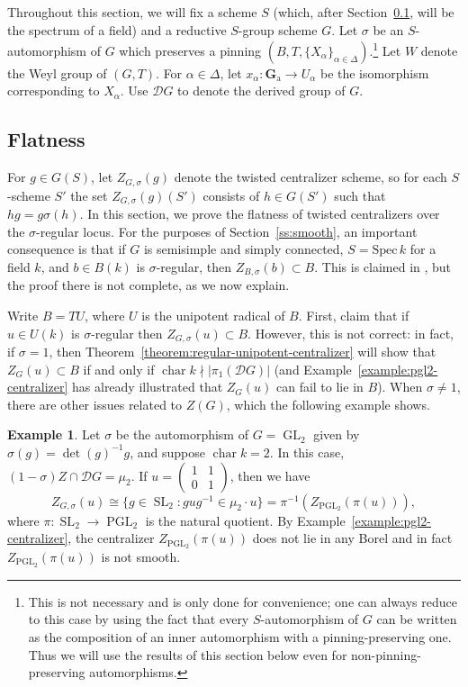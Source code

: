 \documentclass[11pt,reqno]{amsart}
\theoremstyle{definition}
\newtheorem{example}[theorem]{Example}
\renewcommand{\rm}{\mathrm}
\newcommand{\Spec}{\mathrm{Spec} \,}
\newcommand{\bG}{{\mathbf G}}
\newcommand{\sD}{{\mathscr D}}
\newcommand{\bGa}{\bG_{\rm{a}}}
\DeclareMathOperator{\chara}{char}
\DeclareMathOperator{\GL}{GL}
\DeclareMathOperator{\PGL}{PGL}
\DeclareMathOperator{\SL}{SL}
\begin{document}
Throughout this section, we will fix a scheme $S$ (which, after Section~\ref{ss:flat}, will be the spectrum of a field) and a reductive $S$-group scheme $G$. Let $\sigma$ be an $S$-automorphism of $G$ which preserves a pinning $(B, T, \{X_\alpha\}_{\alpha \in \Delta})$.\footnote{This is not necessary and is only done for convenience; one can always reduce to this case by using the fact that every $S$-automorphism of $G$ can be written as the composition of an inner automorphism with a pinning-preserving one. Thus we will use the results of this section below even for non-pinning-preserving automorphisms.} Let $W$ denote the Weyl group of $(G, T)$. For $\alpha \in \Delta$, let $x_\alpha\colon \bGa \to U_\alpha$ be the isomorphism corresponding to $X_\alpha$. Use $\sD G$ to denote the derived group of $G$.

\subsection{Flatness}\label{ss:flat}

For $g \in G(S)$, let $Z_{G,\sigma}(g)$ denote the twisted centralizer scheme, so for each $S$-scheme $S'$ the set $Z_{G,\sigma}(g)(S')$ consists of $h \in G(S')$ such that $hg = g\sigma(h)$. In this section, we prove the flatness of twisted centralizers over the $\sigma$-regular locus. For the purposes of Section~\ref{ss:smooth}, an important consequence is that if $G$ is semisimple and simply connected, $S = \Spec k$ for a field $k$, and $b \in B(k)$ is $\sigma$-regular, then $Z_{B,\sigma}(b) \subset B$. This is claimed in \cite[Proposition 5.2.19(4)]{Xiao-Zhu}, but the proof there is not complete, as we now explain.

Write $B = TU$, where $U$ is the unipotent radical of $B$. First, \cite[Proposition 5.2.4(2) and (4)]{Xiao-Zhu} claim that if $u \in U(k)$ is $\sigma$-regular then $Z_{G,\sigma}(u) \subset B$. However, this is not correct: in fact, if $\sigma = 1$, then Theorem~\ref{theorem:regular-unipotent-centralizer} will show that $Z_G(u) \subset B$ if and only if $\chara k \nmid |\pi_1(\sD G)|$ (and Example~\ref{example:pgl2-centralizer} has already illustrated that $Z_G(u)$ can fail to lie in $B$). When $\sigma \neq 1$, there are other issues related to $Z(G)$, which the following example shows.

\begin{example}
    Let $\sigma$ be the automorphism of $G = \GL_2$ given by $\sigma(g) = \det(g)^{-1} g$, and suppose $\chara k = 2$. In this case, $(1-\sigma)Z \cap \sD G = \mu_2$. If $u = \begin{pmatrix} 1 &1 \\ 0 &1 \end{pmatrix}$, then we have
    \[
    Z_{G,\sigma}(u) \cong \{g \in \SL_2\colon gug^{-1} \in \mu_2 \cdot u\} = \pi^{-1}(Z_{\PGL_2}(\pi(u))),
    \]
    where $\pi\colon \SL_2 \to \PGL_2$ is the natural quotient. By Example~\ref{example:pgl2-centralizer}, the centralizer $Z_{\PGL_2}(\pi(u))$ does not lie in any Borel and in fact $Z_{\PGL_2}(\pi(u))$ is not smooth.
\end{example}
\end{document}
